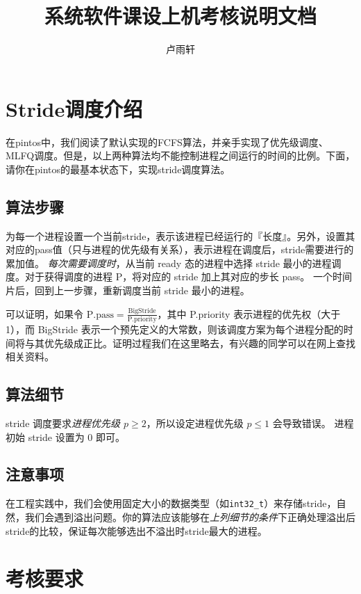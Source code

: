 \documentclass{ctexart}
\title{系统软件课设上机考核说明文档}
\author{卢雨轩}
\begin{document}
\maketitle

\section{Stride调度介绍}

在pintos中，我们阅读了默认实现的FCFS算法，并亲手实现了优先级调度、MLFQ调度。但是，以上两种算法均不能控制进程之间运行的时间的比例。下面，请你在pintos的最基本状态下，实现stride调度算法。

\subsection{算法步骤}
\begin{outline}[enumerate]
    \1 为每一个进程设置一个当前stride，表示该进程已经运行的『长度』。另外，设置其对应的pass值（只与进程的优先级有关系），表示进程在调度后，stride需要进行的累加值。
    \1 \emph{每次需要调度时}，从当前 ready 态的进程中选择 stride 最小的进程调度。对于获得调度的进程 P，将对应的 stride 加上其对应的步长 pass。
    \1 一个时间片后，回到上一步骤，重新调度当前 stride 最小的进程。
\end{outline}

可以证明，如果令 $\mathrm{P.{pass} = \frac{BigStride}{P.{priority}}}$，其中 P.priority 表示进程的优先权（大于 1），而 BigStride 表示一个预先定义的大常数，则该调度方案为每个进程分配的时间将与其优先级成正比。证明过程我们在这里略去，有兴趣的同学可以在网上查找相关资料。

\subsection{算法细节}
\begin{outline}
    \1 stride 调度要求\emph{进程优先级 $p \ge 2$}，所以设定进程优先级 $p \le 1$ 会导致错误。
    \1 进程初始 stride 设置为 0 即可。
\end{outline}

\subsection{注意事项}
在工程实践中，我们会使用固定大小的数据类型（如\texttt{int32\_t}）来存储stride，自然，我们会遇到溢出问题。你的算法应该能够在\emph{上列细节的条件}下正确处理溢出后stride的比较，保证每次能够选出不溢出时stride最大的进程。

\section{考核要求}
\end{document}
